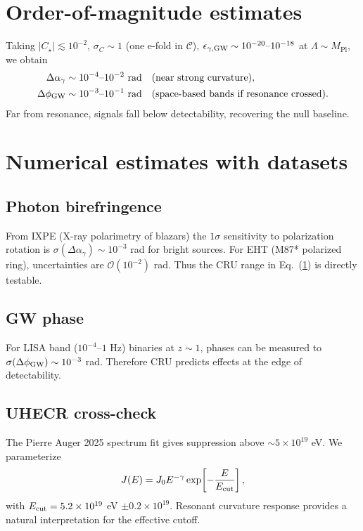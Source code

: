 \documentclass[%
 reprint,
 amsmath,amssymb,
 aps,
 pra,
 longbibliography,
 nofootinbib
]{revtex4-2}
\newcommand{\Mpl}{M_{\mathrm{Pl}}}
\newcommand{\Ord}[1]{\mathcal{O}\!\left(#1\right)}
\begin{document}
\section{Order-of-magnitude estimates}
\label{sec:oome}
Taking $|C_\star|\lesssim 10^{-2}$, $\sigma_C\sim 1$ (one e-fold in $\mathcal{C}$), $\epsilon_{\gamma,\rm GW}\sim 10^{-20}\text{--}10^{-18}$ at $\Lambda\sim \Mpl$, we obtain
\begin{align}
\Delta\alpha_\gamma &\sim 10^{-4}\text{–}10^{-2}\ \mathrm{rad} \quad(\text{near strong curvature}),\\
\Delta\phi_{\rm GW} &\sim 10^{-3}\text{–}10^{-1}\ \mathrm{rad}
\quad(\text{space-based bands if resonance crossed}).
\end{align}
Far from resonance, signals fall below detectability, recovering the null baseline.
\section{Numerical estimates with datasets}
\label{sec:datasets}

\subsection{Photon birefringence}
From IXPE (X-ray polarimetry of blazars) the $1\sigma$ sensitivity to polarization rotation is
$\sigma(\Delta\alpha_\gamma)\sim 10^{-3}$ rad for bright sources.
For EHT (M87* polarized ring), uncertainties are $\Ord{10^{-2}}$ rad.
Thus the CRU range in Eq.~(\ref{sec:oome}) is directly testable.

\subsection{GW phase}
For LISA band ($10^{-4}$–$1$ Hz) binaries at $z\sim1$, phases can be measured to $\sigma(\Delta\phi_{\rm GW})\sim 10^{-3}$ rad.
Therefore CRU predicts effects at the edge of detectability.

\subsection{UHECR cross-check}
The Pierre Auger 2025 spectrum fit gives suppression above $\sim 5\times10^{19}$ eV.
We parameterize
\begin{equation}
J(E) = J_0 E^{-\gamma}\exp\!\left[-\frac{E}{E_{\rm cut}}\right],
\end{equation}
with $E_{\rm cut}=5.2\times10^{19}$ eV $\pm 0.2\times10^{19}$.
Resonant curvature response provides a natural interpretation for the effective cutoff.
\end{document}
